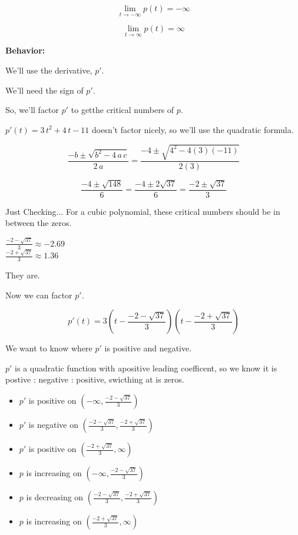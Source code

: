 \documentclass{ximera}
\begin{document}
\begin{example}
\[  \lim\limits_{t \to -\infty} p(t) = -\infty \]


\[  \lim\limits_{t \to \infty} p(t) = \infty \]


\textbf{Behavior:}

We'll use the derivative, $p'$.

We'll need the sign of $p'$. 

So, we'll factor $p'$ to getthe critical numbers of $p$.

$p'(t) = 3 \, t^2 + 4 \, t - 11$ doesn't factor nicely, so we'll use the quadratic formula.


\[ 
\frac{-b \pm \sqrt{b^2 - 4 \, a \, c}}{2 \, a} = \frac{-4 \pm \sqrt{4^2 - 4(3)(-11)}}{2(3)}
\]

\[ 
\frac{-4 \pm \sqrt{148}}{6} = \frac{-4 \pm 2 \sqrt{37}}{6} = \frac{-2 \pm \sqrt{37}}{3}
\]

Just Checking...
For a cubic polynomial, these critical numbers should be in between the zeros.

$ \frac{-2 - \sqrt{37}}{3} \approx -2.69 $ \\
$ \frac{-2 + \sqrt{37}}{3} \approx 1.36 $

They are.


Now we can factor $p'$.


\[ p'(t) = 3 \left( t - \frac{-2 - \sqrt{37}}{3} \right) \left( t - \frac{-2 + \sqrt{37}}{3}\right)
\]

We want to know where $p'$ is positive and negative.

$p'$ is a quadratic function with apositive leading coefficent, so we know it is postive : negative : positive, swicthing at is zeros.


\begin{itemize}
\item $p'$ is positive on $\left(-\infty, \frac{-2 - \sqrt{37}}{3} \right)$
\item $p'$ is negative on $\left(\frac{-2 - \sqrt{37}}{3}, \frac{-2 + \sqrt{37}}{3} \right)$
\item $p'$ is positive on $\left(\frac{-2 + \sqrt{37}}{3}, \infty \right)$
\end{itemize}


\begin{itemize}
\item $p$ is increasing on $\left(-\infty, \frac{-2 - \sqrt{37}}{3} \right)$
\item $p$ is decreasing on $\left(\frac{-2 - \sqrt{37}}{3}, \frac{-2 + \sqrt{37}}{3} \right)$
\item $p$ is increasing on $\left(\frac{-2 + \sqrt{37}}{3}, \infty \right)$
\end{itemize}







\end{example}
\end{document}
